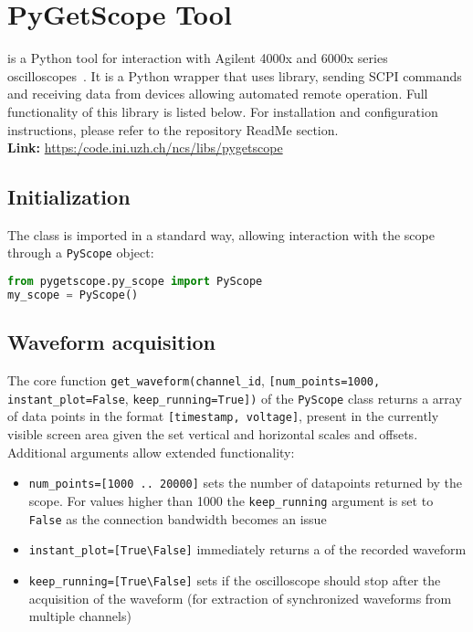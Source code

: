  \chapter{PyGetScope Tool}
 \label{appendix:pyscope}
 is a Python tool for interaction with Agilent 4000x and 6000x series oscilloscopes~\cite{pygetscope}. It is a Python wrapper that uses  library, sending SCPI commands and receiving data from devices allowing automated remote operation. Full functionality of this library is listed below. For installation and configuration instructions, please refer to the repository ReadMe section.\\

\textbf{Link:} \url{https:/code.ini.uzh.ch/ncs/libs/pygetscope}

\section{Initialization}

The class is imported in a standard way, allowing interaction with the scope through a \verb|PyScope| object:

\begin{lstlisting}[language=Python, caption=PyScope module initialization]
from pygetscope.py_scope import PyScope
my_scope = PyScope()
\end{lstlisting}


\section{Waveform acquisition}

The core function \verb|get_waveform(|\verb|channel_id|, \verb|[num_points=1000, instant_plot=False|, \verb|keep_running=True])| of the \verb|PyScope| class returns a  array of data points in the format \verb|[timestamp, voltage]|, present in the currently visible screen area given the set vertical and horizontal scales and offsets.\\

Additional arguments allow extended functionality:
\begin{itemize}
    \item \verb|num_points=[1000 .. 20000]| sets the number of datapoints returned by the scope. For values higher than 1000 the \verb|keep_running| argument is set to \verb|False| as the connection bandwidth becomes an issue 
    \item \verb|instant_plot=[True\False]| immediately returns a  of the recorded waveform
    \item \verb|keep_running=[True\False]| sets if the oscilloscope should stop after the acquisition of the waveform (for extraction of synchronized waveforms from multiple channels)
\end{itemize}


